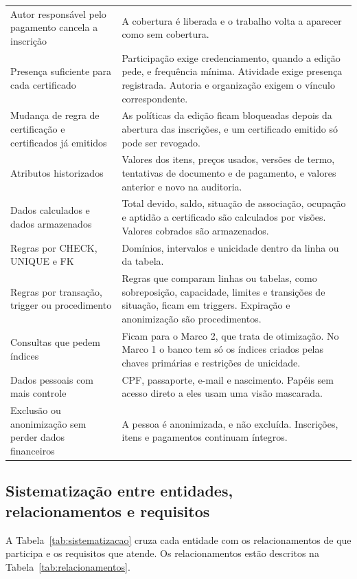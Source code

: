 \begin{longtable}{@{}L{5.6cm} L{8.7cm}@{}}
Autor responsável pelo pagamento cancela a inscrição & A cobertura é liberada e o trabalho volta a aparecer como sem cobertura.\\
Presença suficiente para cada certificado & Participação exige credenciamento, quando a edição pede, e frequência mínima. Atividade exige presença registrada. Autoria e organização exigem o vínculo correspondente.\\
Mudança de regra de certificação e certificados já emitidos & As políticas da edição ficam bloqueadas depois da abertura das inscrições, e um certificado emitido só pode ser revogado.\\
Atributos historizados & Valores dos itens, preços usados, versões de termo, tentativas de documento e de pagamento, e valores anterior e novo na auditoria.\\
Dados calculados e dados armazenados & Total devido, saldo, situação de associação, ocupação e aptidão a certificado são calculados por visões. Valores cobrados são armazenados.\\
Regras por CHECK, UNIQUE e FK & Domínios, intervalos e unicidade dentro da linha ou da tabela.\\
Regras por transação, trigger ou procedimento & Regras que comparam linhas ou tabelas, como sobreposição, capacidade, limites e transições de situação, ficam em triggers. Expiração e anonimização são procedimentos.\\
Consultas que pedem índices & Ficam para o Marco 2, que trata de otimização. No Marco 1 o banco tem só os índices criados pelas chaves primárias e restrições de unicidade.\\
Dados pessoais com mais controle & CPF, passaporte, e-mail e nascimento. Papéis sem acesso direto a eles usam uma visão mascarada.\\
Exclusão ou anonimização sem perder dados financeiros & A pessoa é anonimizada, e não excluída. Inscrições, itens e pagamentos continuam íntegros.\\
\end{longtable}

\subsection{Sistematização entre entidades, relacionamentos e requisitos}

A Tabela~\ref{tab:sistematizacao} cruza cada entidade com os relacionamentos de que participa e os requisitos que atende. Os relacionamentos estão descritos na Tabela~\ref{tab:relacionamentos}.

